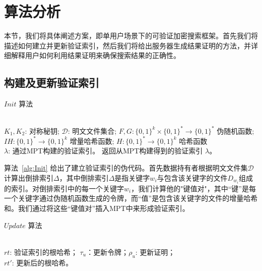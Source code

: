 \section{算法分析}
本节，我们将具体阐述\single 方案，即单用户场景下的可验证加密搜索框架。首先我们将描述如何建立并更新验证索引，然后我们将给出服务器生成结果证明的方法，并详细解释用户如何利用结果证明来确保搜索结果的正确性。

\subsection{构建及更新验证索引}
\begin{algorithm}[ht]
  \caption{$Init$ 算法}
  \label{alg:Init}
  \begin{algorithmic}[1]
    \REQUIRE ~~\\{$K_1,K_2$: 对称秘钥; $\mathcal{D}$: 明文文件集合;  $F, G: \{0, 1\}^k \times \{0, 1\}^* \rightarrow \{0, 1\}^*$ 伪随机函数; $IH: \{0, 1\}^* \rightarrow \{0, 1\}^k$ 增量哈希函数; $H: \{0, 1\}^* \rightarrow \{0, 1\}^k$ 哈希函数}
    \ENSURE ~~\\{$\lambda$: 通过MPT构建的验证索引。}
              \ENDFOR
              \RETURN 返回从MPT构建得到的验证索引 $\lambda$。
  \end{algorithmic}
\end{algorithm}

算法~\ref{alg:Init} 给出了建立验证索引的伪代码。首先数据持有者根据明文文件集$\mathcal{D}$计算出倒排索引$\Delta$，其中倒排索引$\Delta$是指关键字$w_i$与包含该关键字的文件$D_{w_i}$组成的索引。对倒排索引中的每一个关键字$w_i$，我们计算他的"键值对"，其中“键”是每一个关键字通过伪随机函数生成的令牌，而“值”是包含该关键字的文件的增量哈希和。我们通过将这些“键值对”插入MPT中来形成验证索引。

\begin{algorithm}[ht]
  \caption{$Update$ 算法}
  \label{alg:update}
  \begin{algorithmic}[1]
    \REQUIRE ~~\\{$rt$: 验证索引的根哈希； $\tau_u$：更新令牌；$\rho_u$: 更新证明；}
    \ENSURE ~~\\{$rt'$: 更新后的根哈希。}
                \ENDIF
              \ENDFOR
  \end{algorithmic}
\end{algorithm}

